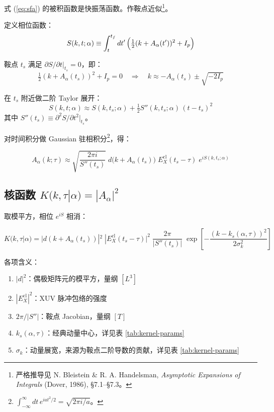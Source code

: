 \documentclass[12pt,a4paper]{ctexart}
\begin{document}
式 (\ref{eq:sfa}) 的被积函数是快振荡函数。作鞍点近似\footnote{严格推导见 N. Bleistein \& R. A. Handelsman, \textit{Asymptotic Expansions of Integrals} (Dover, 1986), §7.1--§7.3。}。

定义相位函数：
\begin{equation}\label{eq:phase}
S(k,t;\alpha) \equiv \int_t^{t_f} dt'\,\Bigl(\tfrac12(k+A_\alpha(t'))^2 + I_p\Bigr)
\end{equation}

鞍点 $t_s$ 满足 $\partial S/\partial t|_{t_s} = 0$，即：
\begin{equation}\label{eq:saddle}
\tfrac12(k + A_\alpha(t_s))^2 + I_p = 0
\quad\Longrightarrow\quad
k \approx -A_\alpha(t_s) \pm \sqrt{-2I_p}
\end{equation}

在 $t_s$ 附近做二阶 Taylor 展开：
\begin{equation}
S(k,t;\alpha) \approx S(k,t_s;\alpha) + \tfrac12 S''(k,t_s;\alpha)\,(t-t_s)^2
\end{equation}
其中 $S''(t_s) \equiv \partial^2 S/\partial t^2|_{t_s}$。

对时间积分做 Gaussian 驻相积分\footnote{$\int_{-\infty}^{\infty} dt\,e^{i a t^2/2} = \sqrt{2\pi i/a}$。}，得：

\begin{equation}\label{eq:sfa-stationary}
\boxed{A_\alpha(k;\tau) \approx \sqrt{\frac{2\pi i}{S''(t_s)}}\;
d\bigl(k + A_\alpha(t_s)\bigr)\;
E_X^{\text{cl}}(t_s-\tau)\;
e^{i S(k,t_s;\alpha)}}
\end{equation}

\subsection{核函数 $K(k,\tau|\alpha) = |A_\alpha|^2$}

取模平方，相位 $e^{iS}$ 相消：

\begin{equation}\label{eq:kernel-full}
\boxed{
K(k,\tau|\alpha) = |d(k+A_\alpha(t_s))|^2\;
|E_X^{\text{cl}}(t_s-\tau)|^2\;
\frac{2\pi}{|S''(t_s)|}\;
\exp\!\left[-\frac{(k - k_s(\alpha,\tau))^2}{2\sigma_k^2}\right]
}
\end{equation}

各项含义：
\begin{enumerate}[nosep]
  \item $|d|^2$：偶极矩阵元的模平方，量纲 $[L^3]$
  \item $|E_X^{\text{cl}}|^2$：XUV 脉冲包络的强度
  \item $2\pi/|S''|$：鞍点 Jacobian，量纲 $[T]$
  \item $k_s(\alpha,\tau)$：经典动量中心，详见表 \ref{tab:kernel-params}
  \item $\sigma_k$：动量展宽，来源为鞍点二阶导数的贡献，详见表 \ref{tab:kernel-params}
\end{enumerate}
\end{document}
